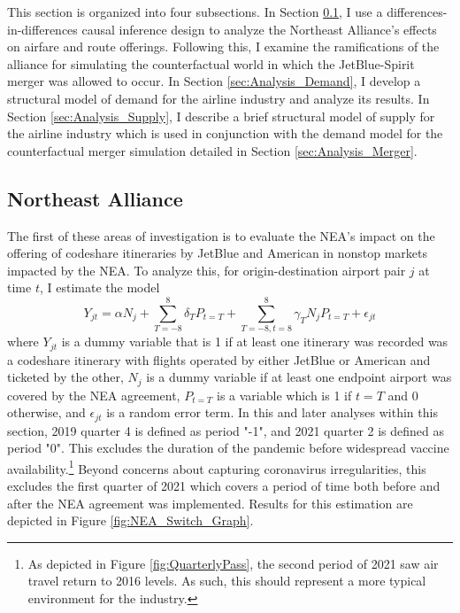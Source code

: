 \documentclass{article}
\begin{document}
	This section is organized into four subsections. In Section \ref{sec:Analysis_NEA}, I use a differences-in-differences causal inference design to analyze the Northeast Alliance's effects on airfare and route offerings. Following this, I examine the ramifications of the alliance for simulating the counterfactual world in which the JetBlue-Spirit merger was allowed to occur. In Section \ref{sec:Analysis_Demand}, I develop a structural model of demand for the airline industry and analyze its results. In Section \ref{sec:Analysis_Supply}, I describe a brief structural model of supply for the airline industry which is used in conjunction with the demand model for the counterfactual merger simulation detailed in Section \ref{sec:Analysis_Merger}. 
	
	\subsection{Northeast Alliance}
	\label{sec:Analysis_NEA}
	The first of these areas of investigation is to evaluate the NEA's impact on the offering of codeshare itineraries by JetBlue and American in nonstop markets impacted by the NEA.  
    To analyze this, for origin-destination airport pair $j$ at time $t$,  I estimate the model \[Y_{jt} = \alpha N_{j} + \sum_{T = -8}^{8} \delta_{T} P_{t = T} + \sum_{T = -8, t = 8}^{8} \gamma_{T} N_{j} P_{t = T} + \epsilon_{jt}\] where $Y_{jt}$ is a dummy variable that is 1 if at least one itinerary was recorded was a codeshare itinerary with flights operated by either JetBlue or American and ticketed by the other,  $N_{j}$ is a dummy variable if at least one endpoint airport was covered by the NEA agreement, $P_{t = T}$ is a variable which is 1 if $t = T$ and 0 otherwise, and $\epsilon_{jt}$ is a random error term. In this and later analyses within this section, 2019 quarter 4 is defined as period "-1", and 2021 quarter 2 is defined as period "0". This excludes the duration of the pandemic before widespread vaccine availability.\footnote{As depicted in Figure \ref{fig:QuarterlyPass}, the second period of 2021 saw air travel return to 2016 levels. As such, this should represent a more typical environment for the industry.} Beyond concerns about capturing coronavirus irregularities, this excludes the first quarter of 2021 which covers a period of time both before and after the NEA agreement was implemented. Results for this estimation are depicted in Figure \ref{fig:NEA_Switch_Graph}. 
\end{document}
